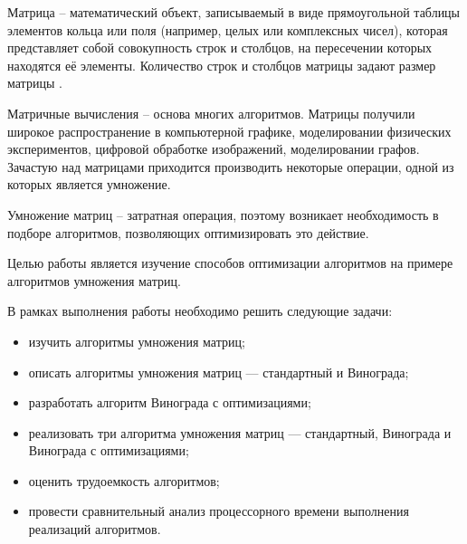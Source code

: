 \vspace{\baselineskip}

Матрица -- математический объект, записываемый в виде прямоугольной таблицы элементов кольца или поля (например, целых или комплексных чисел), которая представляет собой совокупность строк и столбцов, на пересечении которых находятся её элементы. Количество строк и столбцов матрицы задают размер матрицы \cite{article_matrix}.

Матричные вычисления -- основа многих алгоритмов. Матрицы получили широкое распространение в компьютерной графике, моделировании физических экспериментов, цифровой обработке изображений, моделировании графов. Зачастую над матрицами приходится производить некоторые операции, одной из которых является умножение.

Умножение матриц -- затратная операция, поэтому возникает необходимость в подборе алгоритмов, позволяющих оптимизировать это действие.

Целью работы является изучение способов оптимизации алгоритмов на примере алгоритмов умножения матриц.

В рамках выполнения работы необходимо решить следующие задачи:

\begin{itemize}[label=---]
	\item изучить алгоритмы умножения матриц;
	\item описать алгоритмы умножения матриц --- стандартный и Винограда;
	\item разработать алгоритм Винограда с оптимизациями;
	\item реализовать три алгоритма умножения матриц --- стандартный, Винограда и Винограда с оптимизациями;
	\item оценить трудоемкость алгоритмов;
	\item провести сравнительный анализ процессорного времени выполнения реализаций алгоритмов.
\end{itemize}